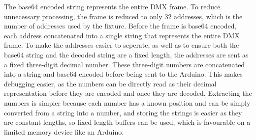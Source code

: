 The base64 encoded string represents the entire DMX frame.
To reduce unnecessary processing, the frame is reduced to only 32 addresses, which is the number of addresses used by the fixture.
Before the frame is base64 encoded, each address concatenated into a single string that represents the entire DMX frame.
To make the addresses easier to seperate, as well as to ensure both the base64 string and the decoded string are a fixed length,
the addresses are sent as a fixed three-digit decimal number.
These three-digit numbers are concatenated into a string and base64 encoded before being sent to the Arduino.
This makes debugging easier, as the numbers can be directly read as their decimal representation before they are encoded and once they are decoded.
Extracting the numbers is simpler because each number has a known position and can be simply converted from a string into a number,
and storing the strings is easier as they are constant lengths, so fixed length buffers can be used,
which is favourable on a limited memory device like an Arduino.

